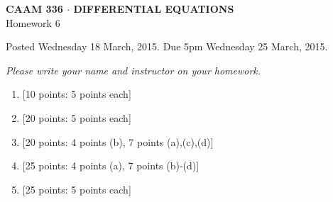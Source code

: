 \documentclass[10pt]{article}
\begin{document}
\vspace*{-5em}
\begin{center}
\large \textsf{\textbf{CAAM 336 $\cdot$ DIFFERENTIAL EQUATIONS}\\[0.5em]
Homework 6 }
\end{center}

Posted Wednesday 18 March, 2015.  Due 5pm Wednesday 25 March, 2015.
\begin{center}
\emph{Please write your name and instructor on your homework.}
\end{center}

\begin{enumerate}
\item {[10 points: 5 points each]}\\  
\item {[20 points: 5 points each]}\\  
\newpage
\item {[20 points: 4 points (b), 7 points (a),(c),(d)]}\\  
\newpage
\item {[25 points: 4 points (a), 7 points (b)-(d)]}\\  
\newpage
\item {[25 points: 5 points each]}\\  

\end{enumerate}
\end{document}
